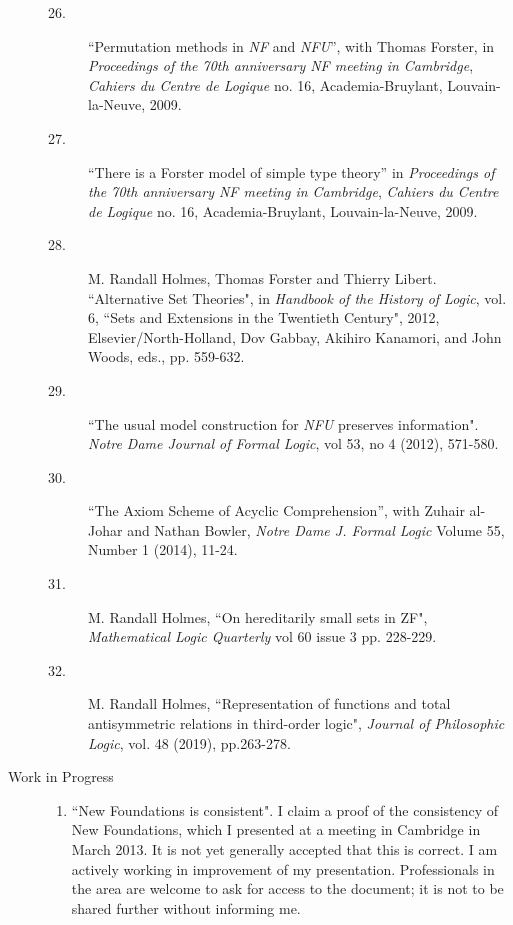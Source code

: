 \begin{description}
\begin{description}
\item[26.] ``Permutation methods in {\em NF\/} and {\em NFU\/}'', with
Thomas Forster, in {\em Proceedings of the 70th anniversary NF meeting
in Cambridge\/}, {\em Cahiers du Centre de Logique\/} no. 16,
Academia-Bruylant, Louvain-la-Neuve, 2009.

\item[27.] ``There is a Forster model of simple type theory'' in {\em
Proceedings of the 70th anniversary NF meeting in Cambridge\/}, {\em
Cahiers du Centre de Logique\/} no. 16, Academia-Bruylant,
Louvain-la-Neuve, 2009.

\item[28.]
M. Randall Holmes, Thomas Forster and Thierry Libert. ``Alternative Set Theories",  in {\em Handbook of the History of Logic\/}, vol. 6, ``Sets and Extensions in the Twentieth Century", 2012, Elsevier/North-Holland, Dov Gabbay, Akihiro Kanamori, and John Woods, eds., pp. 559-632.

\item[29.] ``The usual model construction for {\em NFU\/} preserves information".  {\em Notre Dame Journal of Formal Logic\/}, vol 53, no 4 (2012), 571-580.

\item[30.]  ``The Axiom Scheme of Acyclic Comprehension'', with Zuhair al-Johar and Nathan Bowler, {\em Notre Dame J. Formal Logic\/}
Volume 55, Number 1 (2014), 11-24.

\item[31.]  M. Randall Holmes, ``On hereditarily small sets in ZF", {\em Mathematical Logic Quarterly\/}  vol 60 issue 3 pp. 228-229.

\item[32.]  M. Randall Holmes, ``Representation of functions and total antisymmetric relations in third-order logic", {\em Journal of Philosophic Logic\/}, vol. 48 (2019), pp.263-278.


        \end{description}

\newpage

\item[Work in Progress]
\begin{enumerate}

\item ``New Foundations is consistent".  I claim a proof of the consistency of New Foundations, which I presented at a meeting in Cambridge in March 2013.  It is not yet generally accepted that this is correct.  I am actively working in improvement of my presentation.   Professionals in the area are welcome to ask for access to the document; it is not to be shared further without informing me.


\end{enumerate}
\end{description}
